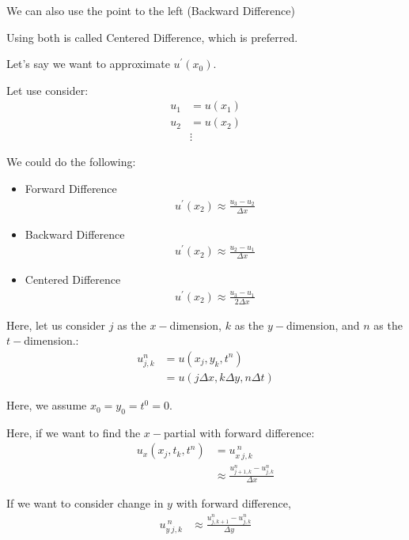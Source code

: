 \documentclass{article}
\begin{document}
We can also use the point to the left (Backward Difference)

Using both is called Centered Difference, which is preferred.


Let's say we want to approximate $u^\prime(x_0)$.

Let use consider:
%
\begin{align}
  u_1 & = u(x_1)\\
  u_2 & = u(x_2)\\
  & \vdots
\end{align}

We could do the following:
%
\begin{itemize}
  \item Forward Difference
  \begin{align}
    u^\prime(x_2) \approx \frac{u_3 - u_2}{\Delta x}
  \end{align}
  \item Backward Difference
  \begin{align}
    u^\prime(x_2) \approx \frac{u_2 - u_1}{\Delta x}
  \end{align}
  \item Centered Difference
  \begin{align}
    u^\prime(x_2) \approx \frac{u_3 - u_1}{2 \Delta x}
  \end{align}
\end{itemize}

Here, let us consider $j$ as the $x-$dimension, $k$ as the $y-$dimension, and $n$ as the $t-$dimension.:
%
\begin{align}
  u^n_{j, k} & = u(x_j, y_k, t^n)\\
  & = u(j \Delta x, k \Delta y, n \Delta t)
\end{align}

Here, we assume $x_0 = y_0 = t^0 = 0$.

Here, if we want to find the $x-$partial with forward difference:
%
\begin{align}
  u_x(x_j, t_k, t^n) & = u^{\ n}_{x\ j, k}\\
  & \approx \frac{u^n_{j + 1, k}-u^n_{j, k}}{\Delta x}
\end{align}

If we want to consider change in $y$ with forward difference,
%
\begin{align}
  u^{\ n}_{y\ j, k}
  & \approx \frac{u^n_{j, k + 1}-u^n_{j, k}}{\Delta y}
\end{align}
\end{document}

